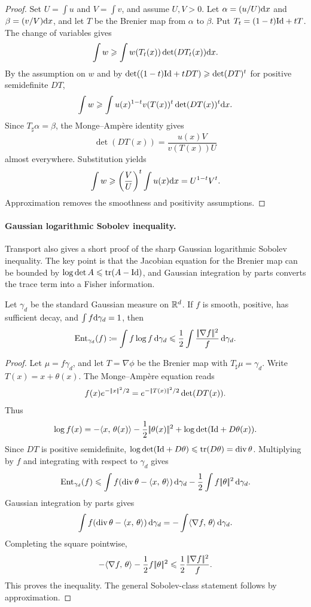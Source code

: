 \begin{proof}
	Set $U=\int u$ and $V=\int v$, and assume $U,V>0$. Let $\alpha=(u/U)\mathrm{d} x$ and $\beta=(v/V)\mathrm{d} x$, and let $T$ be the Brenier map from $\alpha$ to $\beta$. Put $T_t=(1-t)\mathrm{Id}+tT$. The change of variables gives
	\[
		\int w
		\geqslant
		\int w(T_t(x))\det(DT_t(x))\mathrm{d} x .
	\]
	By the assumption on $w$ and by $\det((1-t)\mathrm{Id}+tDT)\geqslant\det(DT)^t$ for positive semidefinite $DT$,
	\[
		\int w
		\geqslant
		\int u(x)^{1-t}v(T(x))^t\det(DT(x))^t\mathrm{d} x.
	\]
	Since $T_\sharp\alpha=\beta$, the Monge--Amp\`ere identity gives
	\[
		\det(DT(x))=\frac{u(x)V}{v(T(x))U}
	\]
	almost everywhere. Substitution yields
	\[
		\int w
		\geqslant
		\left(\frac{V}{U}\right)^t\int u(x)\mathrm{d} x
		=
		U^{1-t}V^t.
	\]
	Approximation removes the smoothness and positivity assumptions.
\end{proof}

\paragraph{Gaussian logarithmic Sobolev inequality.}
Transport also gives a short proof of the sharp Gaussian logarithmic Sobolev inequality. The key point is that the Jacobian equation for the Brenier map can be bounded by $\log\det A\leqslant\operatorname{tr}(A-\mathrm{Id})$, and Gaussian integration by parts converts the trace term into a Fisher information.

\begin{prop}\label{prop-gaussian-log-sobolev-ot}
	Let $\gamma_d$ be the standard Gaussian measure on $\mathbb{R}^d$. If $f$ is smooth, positive, has sufficient decay, and $\int f\mathrm{d}\gamma_d=1$, then
	\[
		\mathrm{Ent}_{\gamma_d}(f)
		\coloneqq
		\int f\log f\,\mathrm{d}\gamma_d
		\leqslant
		\frac12\int \frac{|\!| \nabla f |\!|^2}{f}\,\mathrm{d}\gamma_d.
	\]
\end{prop}

\begin{proof}
	Let $\mu=f\gamma_d$, and let $T=\nabla\phi$ be the Brenier map with $T_\sharp\mu=\gamma_d$. Write $T(x)=x+\theta(x)$. The Monge--Amp\`ere equation reads
	\[
		f(x)e^{-|\!| x |\!|^2/2}
		=
		e^{-|\!| T(x) |\!|^2/2}\det(DT(x)).
	\]
	Thus
	\[
		\log f(x)
		=
		-\langle x,\,\theta(x)\rangle
		-\frac12|\!| \theta(x) |\!|^2
		+
		\log\det(\mathrm{Id}+D\theta(x)).
	\]
	Since $DT$ is positive semidefinite, $\log\det(\mathrm{Id}+D\theta)\leqslant\operatorname{tr}(D\theta)=\operatorname{div}\theta$. Multiplying by $f$ and integrating with respect to $\gamma_d$ gives
	\[
		\mathrm{Ent}_{\gamma_d}(f)
		\leqslant
		\int f(\operatorname{div}\theta-\langle x,\,\theta\rangle)\,\mathrm{d}\gamma_d
		-\frac12\int f|\!| \theta |\!|^2\,\mathrm{d}\gamma_d.
	\]
	Gaussian integration by parts gives
	\[
		\int f(\operatorname{div}\theta-\langle x,\,\theta\rangle)\,\mathrm{d}\gamma_d
		=
		-\int\langle \nabla f,\,\theta\rangle\,\mathrm{d}\gamma_d.
	\]
	Completing the square pointwise,
	\[
		-\langle \nabla f,\,\theta\rangle-\frac12 f|\!| \theta |\!|^2
		\leqslant
		\frac12\frac{|\!| \nabla f |\!|^2}{f}.
	\]
	This proves the inequality. The general Sobolev-class statement follows by approximation.
\end{proof}

